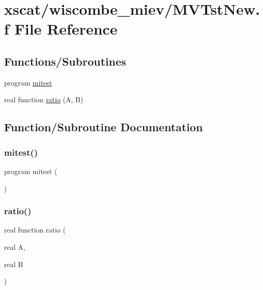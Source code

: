 \hypertarget{_m_v_tst_new_8f}{}\section{xscat/wiscombe\+\_\+miev/\+M\+V\+Tst\+New.f File Reference}
\label{_m_v_tst_new_8f}
\subsection*{Functions/\+Subroutines}
\begin{DoxyCompactItemize}
\item 
program \hyperlink{_m_v_tst_new_8f_a636adb658dfc9c3b74cc98be77994b4a}{mitest}
\item 
real function \hyperlink{_m_v_tst_new_8f_a396222f13423ee47fd1da44298d0e366}{ratio} (A, B)
\end{DoxyCompactItemize}


\subsection{Function/\+Subroutine Documentation}
\mbox{\label{_m_v_tst_new_8f_a636adb658dfc9c3b74cc98be77994b4a}} 
\subsubsection{\texorpdfstring{mitest()}{mitest()}}
{\footnotesize\ttfamily program mitest (\begin{DoxyParamCaption}{ }\end{DoxyParamCaption})}

\mbox{\label{_m_v_tst_new_8f_a396222f13423ee47fd1da44298d0e366}} 
\subsubsection{\texorpdfstring{ratio()}{ratio()}}
{\footnotesize\ttfamily real function ratio (\begin{DoxyParamCaption}\item[{real}]{A,  }\item[{real}]{B }\end{DoxyParamCaption})}

